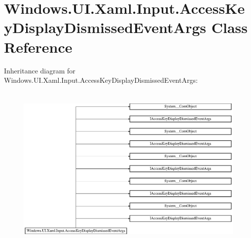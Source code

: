 \hypertarget{class_windows_1_1_u_i_1_1_xaml_1_1_input_1_1_access_key_display_dismissed_event_args}{}\section{Windows.\+U\+I.\+Xaml.\+Input.\+Access\+Key\+Display\+Dismissed\+Event\+Args Class Reference}
\label{class_windows_1_1_u_i_1_1_xaml_1_1_input_1_1_access_key_display_dismissed_event_args}
Inheritance diagram for Windows.\+U\+I.\+Xaml.\+Input.\+Access\+Key\+Display\+Dismissed\+Event\+Args\+:\begin{figure}[H]
\begin{center}
\leavevmode
\includegraphics[height=8.257373cm]{class_windows_1_1_u_i_1_1_xaml_1_1_input_1_1_access_key_display_dismissed_event_args}
\end{center}
\end{figure}
